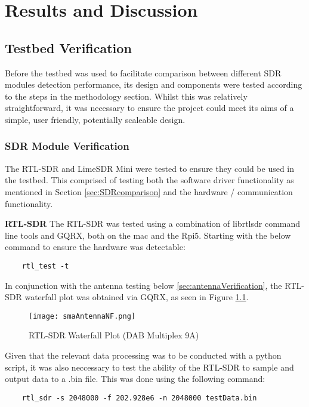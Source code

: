 \chapter{Results and Discussion \label{sec:results}}

\section{Testbed Verification \label{sec:testbedResults}}
Before the testbed was used to facilitate comparison between different SDR modules detection performance, its design and components were tested according to the steps in the methodology section. Whilst this was relatively straightforward, it was necessary to ensure the project could meet its aims of a simple, user friendly, potentially scaleable design. 

\subsection{SDR Module Verification \label{sec:sdrVerification}}
The RTL-SDR and LimeSDR Mini were tested to ensure they could be used in the testbed. This comprised of testing both the software driver functionality as mentioned in Section \ref{sec:SDRcomparison} and the hardware / communication functionality. 
\par \vspace{0.5cm}
\noindent
\textbf{RTL-SDR}
The RTL-SDR was tested using a combination of librtlsdr command line tools and GQRX, both on the mac and the Rpi5. Starting with the below command to ensure the hardware was detectable:

\begin{verbatim}
    rtl_test -t
\end{verbatim}

\noindent 
In conjunction with the antenna testing below \ref{sec:antennaVerification}, the RTL-SDR waterfall plot was obtained via GQRX, as seen in Figure \ref{fig:rtlSDRwaterfall}.

\begin{figure}[h!]
    \centering
    \texttt{[image: smaAntennaNF.png]}
    \caption{RTL-SDR Waterfall Plot (DAB Multiplex 9A)}
    \label{fig:rtlSDRwaterfall}
\end{figure}

Given that the relevant data processing was to be conducted with a python script, it was also neccessary to test the ability of the RTL-SDR to sample and output data to a .bin file. This was done using the following command:
\begin{verbatim}
    rtl_sdr -s 2048000 -f 202.928e6 -n 2048000 testData.bin 
\end{verbatim}

